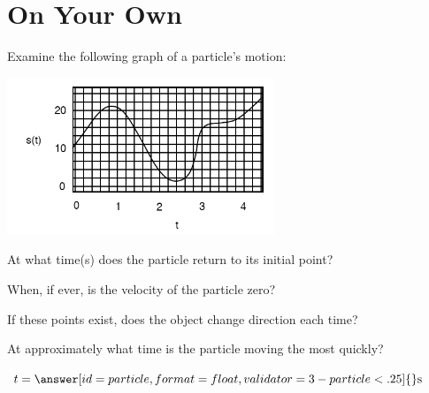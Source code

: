 \documentclass{ximera}
\begin{document}
\section{On Your Own}
\begin{question}
Examine the following graph of a particle's motion:

\begin{image}
    \includegraphics[width=80mm]{position.png}
\end{image}

At what time(s) does the particle return to its initial point?

\begin{selectAll}
\end{selectAll}

When, if ever, is the velocity of the particle zero?

\begin{selectAll}
\end{selectAll}

If these points exist, does the object change direction each time?

\begin{multipleChoice}
\end{multipleChoice}

At approximately what time is the particle moving the most quickly?

$t = \answer[id=particle,format=float,validator= 3-particle < .25]{} \text{s}$
\end{question}
\end{document}
